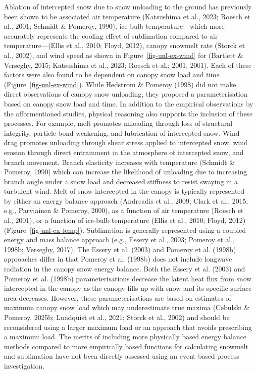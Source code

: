 \documentclass[
]{agujournal2019}
\begin{document}
Ablation of intercepted snow due to snow unloading to the ground has
previously been shown to be associated air temperature (Katsushima et
al., 2023; Roesch et al., 2001; Schmidt \& Pomeroy, 1990), ice-bulb
temperature---which more accurately represents the cooling effect of
sublimation compared to air temperature---(Ellis et al., 2010; Floyd,
2012), canopy snowmelt rate (Storck et al., 2002), and wind speed as
shown in Figure~\ref{fig-unl-ex-wind} for (Bartlett \& Verseghy, 2015;
Katsushima et al., 2023; Roesch et al.; 2001, 2001). Each of these
factors were also found to be dependent on canopy snow load and time
(Figure~\ref{fig-unl-ex-wind}). While Hedstrom \& Pomeroy (1998) did not
make direct observations of canopy snow unloading, they proposed a
parameterisation based on canopy snow load and time. In addition to the
empirical observations by the afformentioned studies, physical reasoning
also supports the inclusion of these processes. For example, melt
promotes unloading through loss of structural integrity, particle bond
weakening, and lubrication of intercepted snow. Wind drag promotes
unloading through shear stress applied to intercepted snow, wind erosion
through direct entrainment in the atmosphere of intercepted snow, and
branch movement. Branch elasticity increases with temperature (Schmidt
\& Pomeroy, 1990) which can increase the likelihood of unloading due to
increasing branch angle under a snow load and decreased stiffness to
resist swaying in a turbulent wind. Melt of snow intercepted in the
canopy is typically represented by either an energy balance approach
(Andreadis et al., 2009; Clark et al., 2015; e.g., Parviainen \&
Pomeroy, 2000), as a function of air temperature (Roesch et al., 2001),
or a function of ice-bulb temperature (Ellis et al., 2010; Floyd, 2012)
(Figure~\ref{fig-unl-ex-temp}). Sublimation is generally represented
using a coupled energy and mass balance approach (e.g., Essery et al.,
2003; Pomeroy et al., 1998b; Verseghy, 2017). The Essery et al. (2003)
and Pomeroy et al. (1998b) approaches differ in that Pomeroy et al.
(1998b) does not include longwave radiation in the canopy snow energy
balance. Both the Essery et al. (2003) and Pomeroy et al. (1998b)
parameterisations decrease the latent heat flux from snow intercepted in
the canopy as the canopy fills up with snow and its specific surface
area decreases. However, these parameterisations are based on estimates
of maximum canopy snow load which may underestimate true maxima
(Cebulski \& Pomeroy, 2025b; Lundquist et al., 2021; Storck et al.,
2002) and should be reconsidered using a larger maximum load or an
approach that avoids prescribing a maximum load. The merits of including
more physically based energy balance methods compared to more
empirically based functions for calculating snowmelt and sublimation
have not been directly assessed using an event-based process
investigation.
\end{document}
